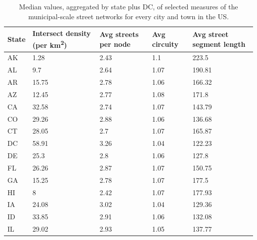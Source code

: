 \documentclass[Afour,sageh,times]{sagej}
\begin{document}
\begin{table}
\centering
\caption{Median values, aggregated by state plus DC, of selected measures of the municipal-scale street networks for every city and town in the US.}
\label{table04}
\begin{tabular}{p{1in}p{1in}p{1in}p{1in}p{1in}}
	\toprule
	State & Intersect density (per km\textsuperscript{2}) & Avg streets per node & Avg circuity & Avg street segment length \\
	\midrule
	AK    & 1.28                        & 2.43                 & 1.1          & 223.5                     \\
	AL    & 9.7                         & 2.64                 & 1.07         & 190.81                    \\
	AR    & 15.75                       & 2.78                 & 1.06         & 166.32                    \\
	AZ    & 12.45                       & 2.77                 & 1.08         & 171.8                     \\
	CA    & 32.58                       & 2.74                 & 1.07         & 143.79                    \\
	CO    & 29.26                       & 2.88                 & 1.06         & 136.68                    \\
	CT    & 28.05                       & 2.7                  & 1.07         & 165.87                    \\
	DC    & 58.91                       & 3.26                 & 1.04         & 122.23                    \\
	DE    & 25.3                        & 2.8                  & 1.06         & 127.8                     \\
	FL    & 26.26                       & 2.87                 & 1.07         & 150.75                    \\
	GA    & 15.25                       & 2.78                 & 1.07         & 177.5                     \\
	HI    & 8                           & 2.42                 & 1.07         & 177.93                    \\
	IA    & 24.08                       & 3.02                 & 1.04         & 129.36                    \\
	ID    & 33.85                       & 2.91                 & 1.06         & 132.08                    \\
	IL    & 29.02                       & 2.93                 & 1.05         & 137.77                    \\

\end{tabular}
\end{table}
\end{document}
